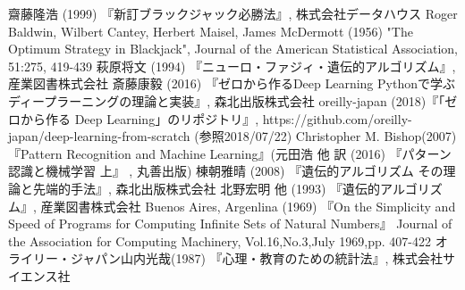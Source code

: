 \begin{thebibliography}{9}
   齋藤隆浩 (1999) 『新訂ブラックジャック必勝法』, 株式会社データハウス
   Roger Baldwin, Wilbert Cantey, Herbert Maisel, James McDermott (1956) "The Optimum Strategy in Blackjack", Journal of the American Statistical Association, 51:275, 419-439
   萩原将文 (1994) 『ニューロ・ファジィ・遺伝的アルゴリズム』, 産業図書株式会社
   斎藤康毅 (2016) 『ゼロから作るDeep Learning Pythonで学ぶディープラーニングの理論と実装』, 森北出版株式会社
   oreilly-japan (2018)『「ゼロから作る Deep Learning」のリポジトリ』, https://github.com/oreilly-japan/deep-learning-from-scratch (参照2018/07/22) 
   Christopher M. Bishop(2007)『Pattern Recognition and Machine Learning』(元田浩 他 訳 (2016) 『パターン認識と機械学習 上』 , 丸善出版)
   棟朝雅晴 (2008) 『遺伝的アルゴリズム その理論と先端的手法』, 森北出版株式会社
   北野宏明 他 (1993) 『遺伝的アルゴリズム』, 産業図書株式会社
   Buenos Aires, Argenlina (1969) 『On the Simplicity and Speed of Programs for Computing Infinite Sets of Natural Numbers』 Journal of the Association for Computing Machinery, Vol.16,No.3,July 1969,pp. 407-422
   オライリー・ジャパン山内光哉(1987) 『心理・教育のための統計法』, 株式会社サイエンス社
\end{thebibliography}
